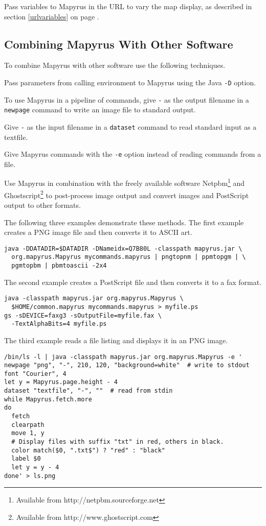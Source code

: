 Pass variables to Mapyrus in the URL to vary the map display,
as described in section \ref{urlvariables}
on page \pageref{urlvariables}.

\subsection{Combining Mapyrus With Other Software}

To combine Mapyrus with other software use the following
techniques.

Pass parameters from calling environment to Mapyrus using the Java
\texttt{-D} option.

To use Mapyrus in a pipeline of commands,
give \texttt{-} as the output filename in a
\texttt{newpage}
command to write an image file to standard output.

Give \texttt{-} as the input filename in a
\texttt{dataset}
command to read standard input as a textfile.

Give Mapyrus commands with the \texttt{-e} option
instead of reading commands from a file.

Use Mapyrus in combination with the freely available software
Netpbm\footnote{Available from http://netpbm.sourceforge.net} and
Ghostscript\footnote{Available from http://www.ghostscript.com} to post-process
image output and convert images and PostScript output to other formats.

The following three examples demonstrate these methods.
The first example creates a PNG image file and then converts it to ASCII art.

\begin{verbatim}
java -DDATADIR=$DATADIR -DNameidx=Q7B80L -classpath mapyrus.jar \
  org.mapyrus.Mapyrus mycommands.mapyrus | pngtopnm | ppmtopgm | \
  pgmtopbm | pbmtoascii -2x4
\end{verbatim}

The second example creates a PostScript file and then converts it
to a fax format.

\begin{verbatim}
java -classpath mapyrus.jar org.mapyrus.Mapyrus \
  $HOME/common.mapyrus mycommands.mapyrus > myfile.ps
gs -sDEVICE=faxg3 -sOutputFile=myfile.fax \
  -TextAlphaBits=4 myfile.ps
\end{verbatim}

The third example reads a file listing and displays it in an
PNG image.

\begin{verbatim}
/bin/ls -l | java -classpath mapyrus.jar org.mapyrus.Mapyrus -e '
newpage "png", "-", 210, 120, "background=white"  # write to stdout
font "Courier", 4
let y = Mapyrus.page.height - 4
dataset "textfile", "-", ""  # read from stdin
while Mapyrus.fetch.more
do
  fetch 
  clearpath
  move 1, y
  # Display files with suffix "txt" in red, others in black.
  color match($0, ".txt$") ? "red" : "black"
  label $0
  let y = y - 4
done' > ls.png
\end{verbatim}

